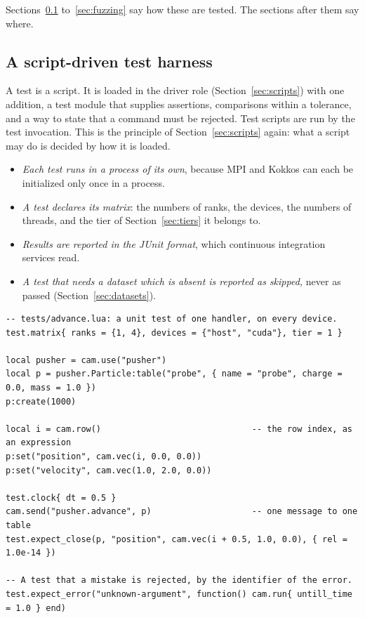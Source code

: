 \documentclass[11pt,a4paper]{article}
\begin{document}
Sections~\ref{sec:harness} to~\ref{sec:fuzzing} say how these are tested.
The sections after them say where.

\subsection{A script-driven test harness}
\label{sec:harness}

A test is a script.  It is loaded in the driver role
(Section~\ref{sec:scripts}) with one addition, a test module that supplies
assertions, comparisons within a tolerance, and a way to state that a
command must be rejected.  Test scripts are run by the test invocation.
This is the principle of Section~\ref{sec:scripts} again: what a script may
do is decided by how it is loaded.

\begin{itemize}
  \item \emph{Each test runs in a process of its own}, because MPI and
        Kokkos can each be initialized only once in a process.
  \item \emph{A test declares its matrix}: the numbers of ranks, the
        devices, the numbers of threads, and the tier of
        Section~\ref{sec:tiers} it belongs to.
  \item \emph{Results are reported in the JUnit format}, which continuous
        integration services read.
  \item \emph{A test that needs a dataset which is absent is reported as
        skipped,} never as passed (Section~\ref{sec:datasets}).
\end{itemize}

\begin{lstlisting}[language={[5.3]Lua}]
-- tests/advance.lua: a unit test of one handler, on every device.
test.matrix{ ranks = {1, 4}, devices = {"host", "cuda"}, tier = 1 }

local pusher = cam.use("pusher")
local p = pusher.Particle:table("probe", { name = "probe", charge = 0.0, mass = 1.0 })
p:create(1000)

local i = cam.row()                              -- the row index, as an expression
p:set("position", cam.vec(i, 0.0, 0.0))
p:set("velocity", cam.vec(1.0, 2.0, 0.0))

test.clock{ dt = 0.5 }
cam.send("pusher.advance", p)                    -- one message to one table
test.expect_close(p, "position", cam.vec(i + 0.5, 1.0, 0.0), { rel = 1.0e-14 })

-- A test that a mistake is rejected, by the identifier of the error.
test.expect_error("unknown-argument", function() cam.run{ untill_time = 1.0 } end)
\end{lstlisting}
\end{document}
